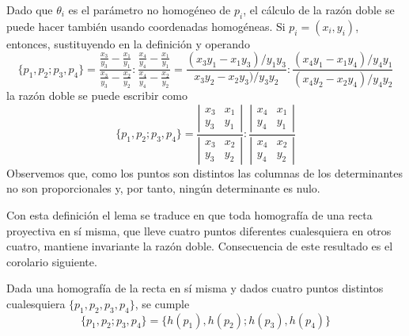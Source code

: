 \begin{obs}
	Dado que $\theta_i$ es el parámetro no homogéneo de $p_i$, el cálculo de la razón doble se puede hacer también usando coordenadas homogéneas. Si $p_i=(x_i,y_i)$, entonces, sustituyendo en la definición y operando
	\begin{equation*}
		\{p_1,p_2;p_3,p_4\}=\frac{\frac{x_3}{y_3}-\frac{x_1}{y_1}}{\frac{x_3}{y_3}-\frac{x_2}{y_2}}:\frac{\frac{x_4}{y_4}-\frac{x_1}{y_1}}{\frac{x_4}{y_4}-\frac{x_2}{y_2}}=\frac{(x_3y_1-x_1y_3)/y_1y_3}{x_3y_2-x_2y_3)/y_3y_2}:\frac{(x_4y_1-x_1y_4)/y_4y_1}{(x_4y_2-x_2y_4)/y_4y_2}
	\end{equation*}
	la razón doble se puede escribir como
	\begin{equation}
	\{p_1,p_2;p_3,p_4\}=\frac{
		\left| \begin{array}{cc}
				x_3&x_1\\
				y_3&y_1
		\end{array}\right|}{
		\left| \begin{array}{cc}
		x_3&x_2\\
		y_3&y_2
		\end{array}\right|}:\frac{
		\left| \begin{array}{cc}
		x_4&x_1\\
		y_4&y_1
		\end{array}\right|}{
		\left| \begin{array}{cc}
		x_4&x_2\\
		y_4&y_2
		\end{array}\right|}
	\end{equation}
	Observemos que, como los puntos son distintos las columnas de los determinantes no son proporcionales y, por tanto, ningún determinante es nulo.
\end{obs}
Con esta definición el lema se traduce en que toda homografía de una recta proyectiva en sí misma, que lleve cuatro puntos diferentes cualesquiera en otros cuatro, mantiene invariante la razón doble. Consecuencia de este resultado es el corolario siguiente.
\begin{cor}
	Dada una homografía de la recta en sí misma y dados cuatro puntos distintos cualesquiera $\{p_1,p_2,p_3,p_4\}$, se cumple
	\begin{equation}
	\{p_1,p_2;p_3,p_4\}=\{h(p_1),h(p_2);h(p_3),h(p_4)\}
	\end{equation} 
\end{cor}
